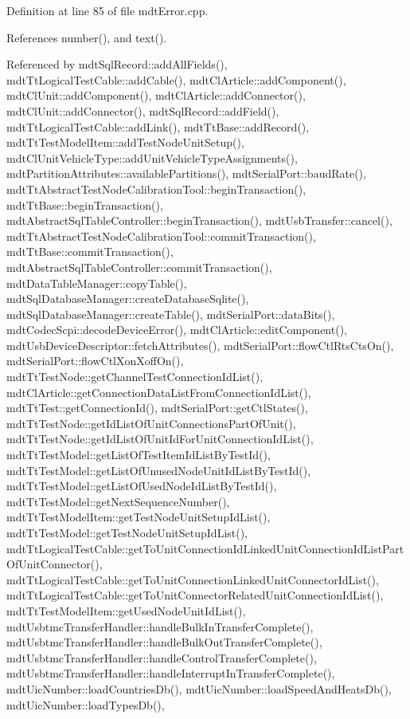 Definition at line 85 of file mdt\-Error.\-cpp.



References number(), and text().



Referenced by mdt\-Sql\-Record\-::add\-All\-Fields(), mdt\-Tt\-Logical\-Test\-Cable\-::add\-Cable(), mdt\-Cl\-Article\-::add\-Component(), mdt\-Cl\-Unit\-::add\-Component(), mdt\-Cl\-Article\-::add\-Connector(), mdt\-Cl\-Unit\-::add\-Connector(), mdt\-Sql\-Record\-::add\-Field(), mdt\-Tt\-Logical\-Test\-Cable\-::add\-Link(), mdt\-Tt\-Base\-::add\-Record(), mdt\-Tt\-Test\-Model\-Item\-::add\-Test\-Node\-Unit\-Setup(), mdt\-Cl\-Unit\-Vehicle\-Type\-::add\-Unit\-Vehicle\-Type\-Assignments(), mdt\-Partition\-Attributes\-::available\-Partitions(), mdt\-Serial\-Port\-::baud\-Rate(), mdt\-Tt\-Abstract\-Test\-Node\-Calibration\-Tool\-::begin\-Transaction(), mdt\-Tt\-Base\-::begin\-Transaction(), mdt\-Abstract\-Sql\-Table\-Controller\-::begin\-Transaction(), mdt\-Usb\-Transfer\-::cancel(), mdt\-Tt\-Abstract\-Test\-Node\-Calibration\-Tool\-::commit\-Transaction(), mdt\-Tt\-Base\-::commit\-Transaction(), mdt\-Abstract\-Sql\-Table\-Controller\-::commit\-Transaction(), mdt\-Data\-Table\-Manager\-::copy\-Table(), mdt\-Sql\-Database\-Manager\-::create\-Database\-Sqlite(), mdt\-Sql\-Database\-Manager\-::create\-Table(), mdt\-Serial\-Port\-::data\-Bits(), mdt\-Codec\-Scpi\-::decode\-Device\-Error(), mdt\-Cl\-Article\-::edit\-Component(), mdt\-Usb\-Device\-Descriptor\-::fetch\-Attributes(), mdt\-Serial\-Port\-::flow\-Ctl\-Rts\-Cts\-On(), mdt\-Serial\-Port\-::flow\-Ctl\-Xon\-Xoff\-On(), mdt\-Tt\-Test\-Node\-::get\-Channel\-Test\-Connection\-Id\-List(), mdt\-Cl\-Article\-::get\-Connection\-Data\-List\-From\-Connection\-Id\-List(), mdt\-Tt\-Test\-::get\-Connection\-Id(), mdt\-Serial\-Port\-::get\-Ctl\-States(), mdt\-Tt\-Test\-Node\-::get\-Id\-List\-Of\-Unit\-Connections\-Part\-Of\-Unit(), mdt\-Tt\-Test\-Node\-::get\-Id\-List\-Of\-Unit\-Id\-For\-Unit\-Connection\-Id\-List(), mdt\-Tt\-Test\-Model\-::get\-List\-Of\-Test\-Item\-Id\-List\-By\-Test\-Id(), mdt\-Tt\-Test\-Model\-::get\-List\-Of\-Unused\-Node\-Unit\-Id\-List\-By\-Test\-Id(), mdt\-Tt\-Test\-Model\-::get\-List\-Of\-Used\-Node\-Id\-List\-By\-Test\-Id(), mdt\-Tt\-Test\-Model\-::get\-Next\-Sequence\-Number(), mdt\-Tt\-Test\-Model\-Item\-::get\-Test\-Node\-Unit\-Setup\-Id\-List(), mdt\-Tt\-Test\-Model\-::get\-Test\-Node\-Unit\-Setup\-Id\-List(), mdt\-Tt\-Logical\-Test\-Cable\-::get\-To\-Unit\-Connection\-Id\-Linked\-Unit\-Connection\-Id\-List\-Part\-Of\-Unit\-Connector(), mdt\-Tt\-Logical\-Test\-Cable\-::get\-To\-Unit\-Connection\-Linked\-Unit\-Connector\-Id\-List(), mdt\-Tt\-Logical\-Test\-Cable\-::get\-To\-Unit\-Connector\-Related\-Unit\-Connection\-Id\-List(), mdt\-Tt\-Test\-Model\-Item\-::get\-Used\-Node\-Unit\-Id\-List(), mdt\-Usbtmc\-Transfer\-Handler\-::handle\-Bulk\-In\-Transfer\-Complete(), mdt\-Usbtmc\-Transfer\-Handler\-::handle\-Bulk\-Out\-Transfer\-Complete(), mdt\-Usbtmc\-Transfer\-Handler\-::handle\-Control\-Transfer\-Complete(), mdt\-Usbtmc\-Transfer\-Handler\-::handle\-Interrupt\-In\-Transfer\-Complete(), mdt\-Uic\-Number\-::load\-Countries\-Db(), mdt\-Uic\-Number\-::load\-Speed\-And\-Heats\-Db(), mdt\-Uic\-Number\-::load\-Types\-Db(), 